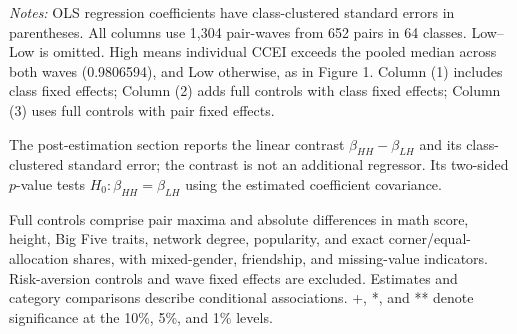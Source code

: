 \documentclass[11pt]{article}
\begin{document}
\footnotesize
\textit{Notes:} OLS regression coefficients have class-clustered standard errors in parentheses. All columns
use 1,304 pair-waves from 652 pairs in 64 classes. Low--Low is omitted. High means individual CCEI exceeds
the pooled median across both waves (0.9806594), and Low otherwise, as in Figure 1. Column (1) includes
class fixed effects; Column (2) adds full controls with class fixed effects; Column (3) uses full controls
with pair fixed effects.

The post-estimation section reports the linear contrast $\beta_{HH}-\beta_{LH}$ and its class-clustered
standard error; the contrast is not an additional regressor. Its two-sided $p$-value tests
$H_0:\beta_{HH}=\beta_{LH}$ using the estimated coefficient covariance.

Full controls comprise pair maxima and absolute differences in math score, height, Big Five traits,
network degree, popularity, and exact corner/equal-allocation shares, with mixed-gender, friendship,
and missing-value indicators. Risk-aversion controls and wave fixed effects are excluded.
Estimates and category comparisons describe conditional associations. +, *, and ** denote significance
at the 10\%, 5\%, and 1\% levels.
\end{document}
